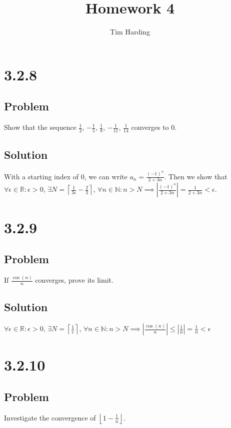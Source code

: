 \documentclass[12pt]{article}
\title{Homework 4}
\author{Tim Harding}
\newcommand{\abs}  [1]{\left|       #1 \right|      }
\newcommand{\floor}[1]{\left\lfloor #1 \right\rfloor}
\newcommand{\ceil} [1]{\left\lceil  #1 \right\rceil }
\newcommand{\R}    [0]{\mathbb{R}                   }
\newcommand{\N}    [0]{\mathbb{N}                   }
\begin{document}
\maketitle

\section*{3.2.8}

\subsection*{Problem}

Show that the sequence $\frac{1}{2}$, $-\frac{1}{5}$, $\frac{1}{8}$, $-\frac{1}{11}$, $\frac{1}{14}$ converges to 0.

\subsection*{Solution}
With a starting index of 0, we can write $a_n = \frac{(-1)^n}{2 + 3n}$. Then we show that $\forall \epsilon \in \R : \epsilon > 0$, $\exists N = \ceil{\frac{1}{3\epsilon} - \frac{2}{3}}$, $\forall n \in \N : n > N \implies \abs{\frac{(-1)^n}{2+3n}} = \frac{1}{2+3n} < \epsilon$.



\section*{3.2.9}

\subsection*{Problem}
If $\frac{\cos(n)}{n}$ converges, prove its limit.

\subsection*{Solution}
$\forall \epsilon \in \R : \epsilon > 0$, $\exists N = \ceil{\frac{1}{\epsilon}}$, $\forall n \in \N : n > N \implies \abs{\frac{\cos(n)}{n}} \leq \abs{\frac{1}{n}} = \frac{1}{n} < \epsilon$




\section*{3.2.10}

\subsection*{Problem}
Investigate the convergence of $\floor{1 - \frac{1}{n}}$.
\end{document}
